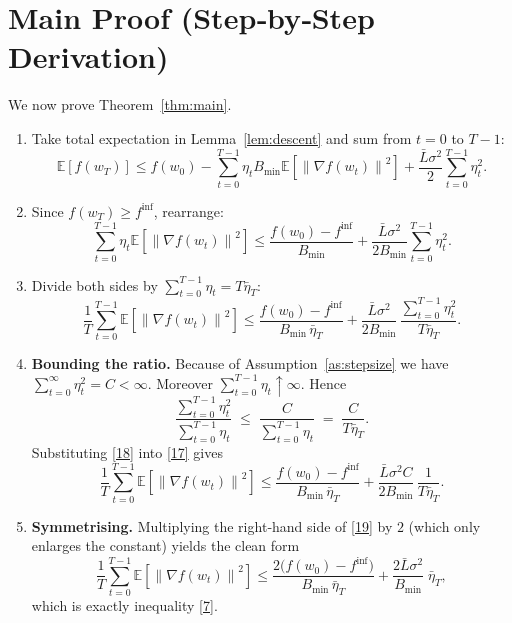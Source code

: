 \documentclass{article}
\newcommand{\E}{\mathbb{E}}
\newcommand{\norm}[1]{\left\|#1\right\|}
\begin{document}
\section*{Main Proof (Step‑by‑Step Derivation)}
We now prove Theorem~\ref{thm:main}.

\begin{enumerate}[label=[Step \arabic*], leftmargin=*]
\item Take total expectation in Lemma~\ref{lem:descent} and sum from $t=0$ to $T-1$:
\[
\E[f(w_{T})]\le f(w_{0})
-\sum_{t=0}^{T-1}\eta_{t}B_{\min}\E\!\left[\norm{\nabla f(w_{t})}^{2}\right]
+\frac{\bar L\sigma^{2}}{2}\sum_{t=0}^{T-1}\eta_{t}^{2}.
\tag{15}
\]

\item Since $f(w_{T})\ge f^{\inf}$, rearrange:
\[
\sum_{t=0}^{T-1}\eta_{t}\E\!\left[\norm{\nabla f(w_{t})}^{2}\right]
\le \frac{f(w_{0})-f^{\inf}}{B_{\min}}
+\frac{\bar L\sigma^{2}}{2B_{\min}}\sum_{t=0}^{T-1}\eta_{t}^{2}.
\tag{16}
\]

\item Divide both sides by $\sum_{t=0}^{T-1}\eta_{t}=T\bar\eta_{T}$:
\[
\frac{1}{T}\sum_{t=0}^{T-1}\E\!\left[\norm{\nabla f(w_{t})}^{2}\right]
\le
\frac{f(w_{0})-f^{\inf}}{B_{\min}\,\bar\eta_{T}}
+\frac{\bar L\sigma^{2}}{2B_{\min}}\,
\frac{\sum_{t=0}^{T-1}\eta_{t}^{2}}{T\bar\eta_{T}}.
\tag{17}
\]

\item %
\textbf{Bounding the ratio.}  
Because of Assumption~\ref{as:stepsize} we have $\sum_{t=0}^{\infty}\eta_{t}^{2}=C<\infty$.
Moreover $\sum_{t=0}^{T-1}\eta_{t}\uparrow\infty$.
Hence
\[
\frac{\sum_{t=0}^{T-1}\eta_{t}^{2}}{\sum_{t=0}^{T-1}\eta_{t}}
\;\le\;
\frac{C}{\sum_{t=0}^{T-1}\eta_{t}}
\;=\;
\frac{C}{T\bar\eta_{T}}.
\tag{18}
\]
Substituting \eqref{18} into \eqref{17} gives
\[
\frac{1}{T}\sum_{t=0}^{T-1}\E\!\left[\norm{\nabla f(w_{t})}^{2}\right]
\le
\frac{f(w_{0})-f^{\inf}}{B_{\min}\,\bar\eta_{T}}
+\frac{\bar L\sigma^{2}C}{2B_{\min}}\,
\frac{1}{T\bar\eta_{T}}.
\tag{19}
\]

\item %
\textbf{Symmetrising.}  
Multiplying the right‑hand side of \eqref{19} by $2$ (which only enlarges the constant) yields the clean form
\[
\frac{1}{T}\sum_{t=0}^{T-1}\E\!\left[\norm{\nabla f(w_{t})}^{2}\right]
\le
\frac{2\bigl(f(w_{0})-f^{\inf}\bigr)}{B_{\min}\,\bar\eta_{T}}
+\frac{2\bar L\sigma^{2}}{B_{\min}}\;\bar\eta_{T},
\tag{20}
\]
which is exactly inequality \eqref{7}.  %


\end{enumerate}
\end{document}
